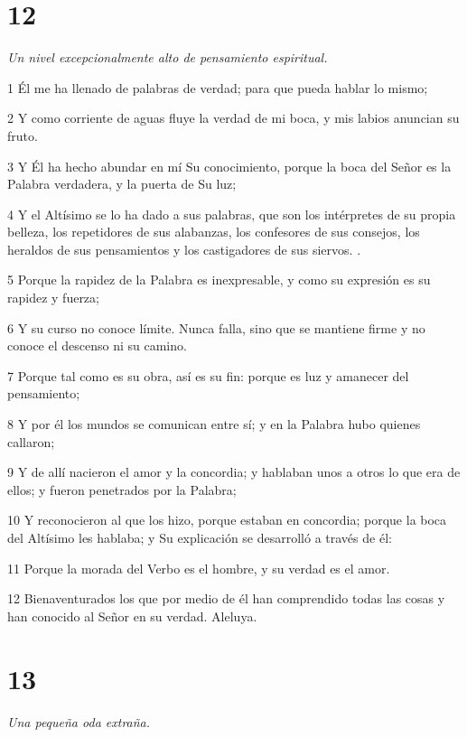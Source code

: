 \chapter{12}

\par \textit{Un nivel excepcionalmente alto de pensamiento espiritual.}

\par 1 Él me ha llenado de palabras de verdad; para que pueda hablar lo mismo;
\par 2 Y como corriente de aguas fluye la verdad de mi boca, y mis labios anuncian su fruto.
\par 3 Y Él ha hecho abundar en mí Su conocimiento, porque la boca del Señor es la Palabra verdadera, y la puerta de Su luz;
\par 4 Y el Altísimo se lo ha dado a sus palabras, que son los intérpretes de su propia belleza, los repetidores de sus alabanzas, los confesores de sus consejos, los heraldos de sus pensamientos y los castigadores de sus siervos. .
\par 5 Porque la rapidez de la Palabra es inexpresable, y como su expresión es su rapidez y fuerza;
\par 6 Y su curso no conoce límite. Nunca falla, sino que se mantiene firme y no conoce el descenso ni su camino.
\par 7 Porque tal como es su obra, así es su fin: porque es luz y amanecer del pensamiento;
\par 8 Y por él los mundos se comunican entre sí; y en la Palabra hubo quienes callaron;
\par 9 Y de allí nacieron el amor y la concordia; y hablaban unos a otros lo que era de ellos; y fueron penetrados por la Palabra;
\par 10 Y reconocieron al que los hizo, porque estaban en concordia; porque la boca del Altísimo les hablaba; y Su explicación se desarrolló a través de él:
\par 11 Porque la morada del Verbo es el hombre, y su verdad es el amor.
\par 12 Bienaventurados los que por medio de él han comprendido todas las cosas y han conocido al Señor en su verdad. Aleluya.

\chapter{13}

\par \textit{Una pequeña oda extraña.}


